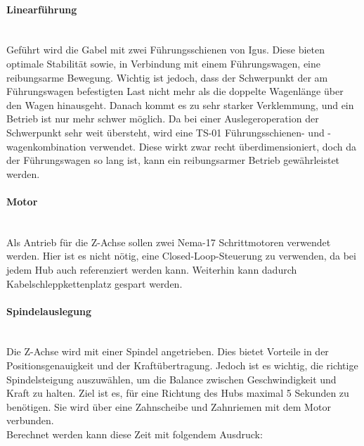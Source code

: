 \paragraph{Linearführung}\mbox{}\\
Geführt wird die Gabel mit zwei Führungsschienen von Igus. Diese bieten optimale Stabilität sowie, in Verbindung mit einem Führungswagen, eine reibungsarme Bewegung. Wichtig ist jedoch, dass der Schwerpunkt der am Führungswagen befestigten Last nicht mehr als die doppelte Wagenlänge über den Wagen hinausgeht. Danach kommt es zu sehr starker Verklemmung, und ein Betrieb ist nur mehr schwer möglich. Da bei einer Auslegeroperation der Schwerpunkt sehr weit übersteht, wird eine TS-01 Führungsschienen- und -wagenkombination verwendet. Diese wirkt zwar recht überdimensioniert, doch da der Führungswagen so lang ist, kann ein reibungsarmer Betrieb gewährleistet werden.

\paragraph{Motor}\mbox{}\\
Als Antrieb für die Z-Achse sollen zwei Nema-17 Schrittmotoren verwendet werden. Hier ist es nicht nötig, eine Closed-Loop-Steuerung zu verwenden, da bei jedem Hub auch referenziert werden kann. Weiterhin kann dadurch Kabelschleppkettenplatz gespart werden.

\paragraph{Spindelauslegung}\mbox{}\\
Die Z-Achse wird mit einer Spindel angetrieben. Dies bietet Vorteile in der Positionsgenauigkeit und der Kraftübertragung. Jedoch ist es wichtig, die richtige Spindelsteigung auszuwählen, um die Balance zwischen Geschwindigkeit und Kraft zu halten. Ziel ist es, für eine Richtung des Hubs maximal 5 Sekunden zu benötigen. Sie wird über eine Zahnscheibe und Zahnriemen mit dem Motor verbunden.\\
Berechnet werden kann diese Zeit mit folgendem Ausdruck:

